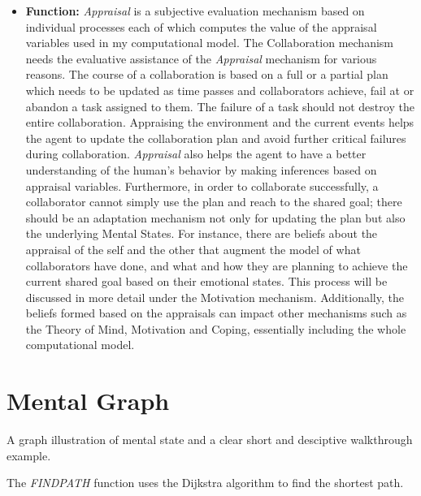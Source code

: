 \documentclass[letterpaper]{article}
\begin{document}
\begin{itemize}
  \item \textbf{Function:} \textit{Appraisal} is a subjective evaluation
  mechanism based on individual processes each of which computes the value of
  the appraisal variables used in my computational model. The Collaboration
  mechanism needs the evaluative assistance of the \textit{Appraisal} mechanism
  for various reasons. The course of a collaboration is based on a full or a
  partial plan which needs to be updated as time passes and collaborators
  achieve, fail at or abandon a task assigned to them. The failure of a task
  should not destroy the entire collaboration. Appraising the environment and
  the current events helps the agent to update the collaboration plan and avoid
  further critical failures during collaboration. \textit{Appraisal} also helps
  the agent to have a better understanding of the human's behavior by making
  inferences based on appraisal variables. Furthermore, in order to collaborate
  successfully, a collaborator cannot simply use the plan and reach to the
  shared goal; there should be an adaptation mechanism not only for updating the
  plan but also the underlying Mental States. For instance, there are beliefs
  about the appraisal of the self and the other that augment the model of what
  collaborators have done, and what and how they are planning to achieve the
  current shared goal based on their emotional states. This process will be
  discussed in more detail under the Motivation mechanism. Additionally, the
  beliefs formed based on the appraisals can impact other mechanisms such as the
  Theory of Mind, Motivation and Coping, essentially including the whole
  computational model.
  
\end{itemize}

\section{Mental Graph}
\label{sec:mental-graph}

A graph illustration of mental state and a clear short and desciptive
walkthrough example.

The \textit{F{\fontsize{8}{8}\selectfont IND}P{\fontsize{8}{8}\selectfont ATH}}
function uses the Dijkstra algorithm to find the shortest path.
\end{document}
